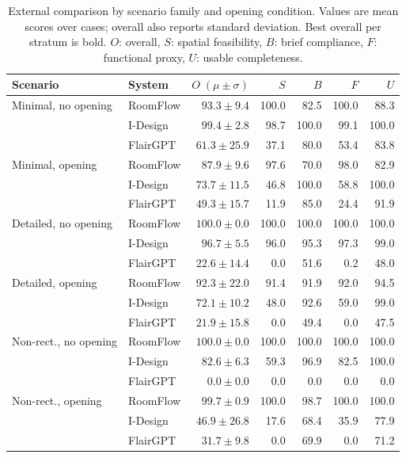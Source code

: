 \documentclass[pdflatex,sn-mathphys-num]{sn-jnl}
\newcommand{\method}{RoomFlow}
\begin{document}
\begin{table}[!t]
  \caption{External comparison by scenario family and opening condition. Values are mean scores over cases; overall also reports standard deviation. Best overall per stratum is bold. \(O\): overall, \(S\): spatial feasibility, \(B\): brief compliance, \(F\): functional proxy, \(U\): usable completeness.}\label{tab:external-results}
  \centering
  \scriptsize
  \setlength{\tabcolsep}{3.1pt}
  \begin{tabular}{@{}llrrrrr@{}}
    \toprule
    Scenario & System & \(O\;(\mu\pm\sigma)\) & \(S\) & \(B\) & \(F\) & \(U\) \\
    \midrule
    Minimal, no opening
      & \method & \(93.3\pm9.4\) & 100.0 & 82.5 & 100.0 & 88.3 \\
      & I-Design & \(\mathbf{99.4\pm2.8}\) & 98.7 & 100.0 & 99.1 & 100.0 \\
      & FlairGPT & \(61.3\pm25.9\) & 37.1 & 80.0 & 53.4 & 83.8 \\
    \addlinespace
    Minimal, opening
      & \method & \(\mathbf{87.9\pm9.6}\) & 97.6 & 70.0 & 98.0 & 82.9 \\
      & I-Design & \(73.7\pm11.5\) & 46.8 & 100.0 & 58.8 & 100.0 \\
      & FlairGPT & \(49.3\pm15.7\) & 11.9 & 85.0 & 24.4 & 91.9 \\
    \addlinespace
    Detailed, no opening
      & \method & \(\mathbf{100.0\pm0.0}\) & 100.0 & 100.0 & 100.0 & 100.0 \\
      & I-Design & \(96.7\pm5.5\) & 96.0 & 95.3 & 97.3 & 99.0 \\
      & FlairGPT & \(22.6\pm14.4\) & 0.0 & 51.6 & 0.2 & 48.0 \\
    \addlinespace
    Detailed, opening
      & \method & \(\mathbf{92.3\pm22.0}\) & 91.4 & 91.9 & 92.0 & 94.5 \\
      & I-Design & \(72.1\pm10.2\) & 48.0 & 92.6 & 59.0 & 99.0 \\
      & FlairGPT & \(21.9\pm15.8\) & 0.0 & 49.4 & 0.0 & 47.5 \\
    \addlinespace
    Non-rect., no opening
      & \method & \(\mathbf{100.0\pm0.0}\) & 100.0 & 100.0 & 100.0 & 100.0 \\
      & I-Design & \(82.6\pm6.3\) & 59.3 & 96.9 & 82.5 & 100.0 \\
      & FlairGPT & \(0.0\pm0.0\) & 0.0 & 0.0 & 0.0 & 0.0 \\
    \addlinespace
    Non-rect., opening
      & \method & \(\mathbf{99.7\pm0.9}\) & 100.0 & 98.7 & 100.0 & 100.0 \\
      & I-Design & \(46.9\pm26.8\) & 17.6 & 68.4 & 35.9 & 77.9 \\
      & FlairGPT & \(31.7\pm9.8\) & 0.0 & 69.9 & 0.0 & 71.2 \\
    \bottomrule
  \end{tabular}
\end{table}
\end{document}
